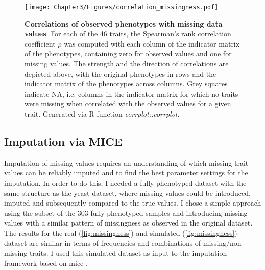 \begin{figure}[hbtp]
	\centering
	\texttt{[image: Chapter3/Figures/correlation\_missingness.pdf]}
	\caption[\textbf{Correlations of observed phenotypes with missing data values.}]{\textbf{Correlations of observed phenotypes with missing data values}. For each of the \num{46} traits, the Spearman's rank correlation coefficient \(\rho\) was computed with each column of the indicator matrix of the phenotypes, containing zero for observed values and one for missing values. The strength and the direction of correlations are depicted above, with the original phenotypes in rows and the indicator matrix of the phenotypes across columns.  Grey squares indicate NA, i.e. columns in the indicator matrix for which no traits were missing when correlated with the observed values for a given trait. Generated via R function \textit{corrplot::corrplot}.}
 	\label{fig:missingnesscorrelations}
\end{figure}

\subsection{Imputation via MICE} 
Imputation of missing values requires an understanding of which missing trait values can be reliably imputed and to find the best parameter settings for the imputation. In order to do this, I needed a fully phenotyped dataset with the same structure as the yeast dataset, where missing values could be introduced, imputed and subsequently compared to the true values. I chose a simple approach using the subset of the \num{303} fully phenotyped samples and introducing missing values with a similar pattern of missingness as observed in the original dataset. The results for the real (\cref{fig:missingness}) and simulated (\cref{fig:missingness}) dataset are similar in terms of frequencies and combinations of missing/non-missing traits. I used this simulated dataset as input to the imputation framework based on \gls{mice} \citep{vanBuuren2011}. 

